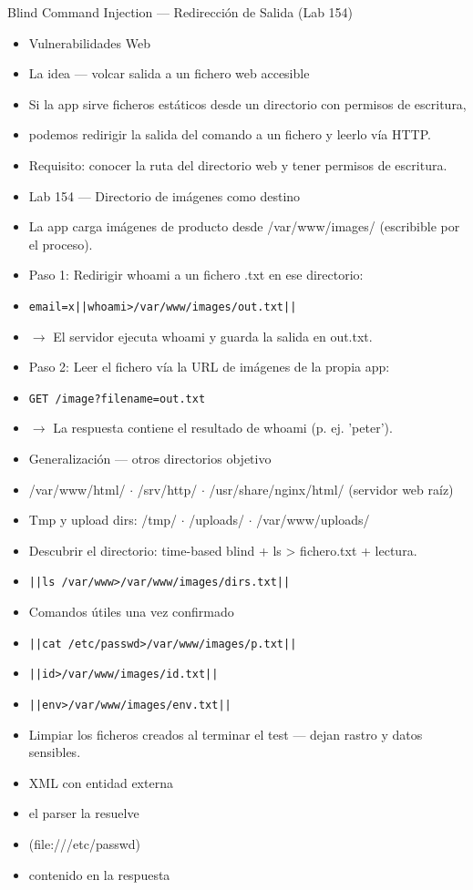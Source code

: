 \documentclass[aspectratio=169,10pt]{beamer}
\newcommand{\cmd}[1]{\texttt{\color{uznavy}#1}}
\begin{document}
\begin{frame}[allowframebreaks]{Blind Command Injection --- Redirección de Salida (Lab 154)}
\small
  \begin{itemize}
  \item Vulnerabilidades Web
  \item La idea --- volcar salida a un fichero web accesible
  \item Si la app sirve ficheros estáticos desde un directorio con permisos de escritura,
  \item podemos redirigir la salida del comando a un fichero y leerlo vía HTTP.
  \item Requisito: conocer la ruta del directorio web y tener permisos de escritura.
  \item Lab 154 --- Directorio de imágenes como destino
  \item La app carga imágenes de producto desde /var/www/images/ (escribible por el proceso).
  \item Paso 1: Redirigir whoami a un fichero .txt en ese directorio:
  \item \cmd{email=x||whoami\textgreater{}/var/www/images/out.txt||}
  \item $\rightarrow$ El servidor ejecuta whoami y guarda la salida en out.txt.
  \item Paso 2: Leer el fichero vía la URL de imágenes de la propia app:
  \item \cmd{GET /image?filename=out.txt}
  \item $\rightarrow$ La respuesta contiene el resultado de whoami (p. ej. 'peter').
  \item Generalización --- otros directorios objetivo
  \item /var/www/html/ $\cdot$ /srv/http/ $\cdot$ /usr/share/nginx/html/ (servidor web raíz)
  \item Tmp y upload dirs: /tmp/ $\cdot$ /uploads/ $\cdot$ /var/www/uploads/
  \item Descubrir el directorio: time-based blind + ls \textgreater{} fichero.txt + lectura.
  \item \cmd{||ls /var/www\textgreater{}/var/www/images/dirs.txt||}
  \item Comandos útiles una vez confirmado
  \item \cmd{||cat /etc/passwd\textgreater{}/var/www/images/p.txt||}
  \item \cmd{||id\textgreater{}/var/www/images/id.txt||}
  \item \cmd{||env\textgreater{}/var/www/images/env.txt||}
  \item Limpiar los ficheros creados al terminar el test --- dejan rastro y datos sensibles.
  \item XML con entidad externa
  \item el parser la resuelve
  \item (file:///etc/passwd)
  \item contenido en la respuesta
  \end{itemize}
\end{frame}
\end{document}
